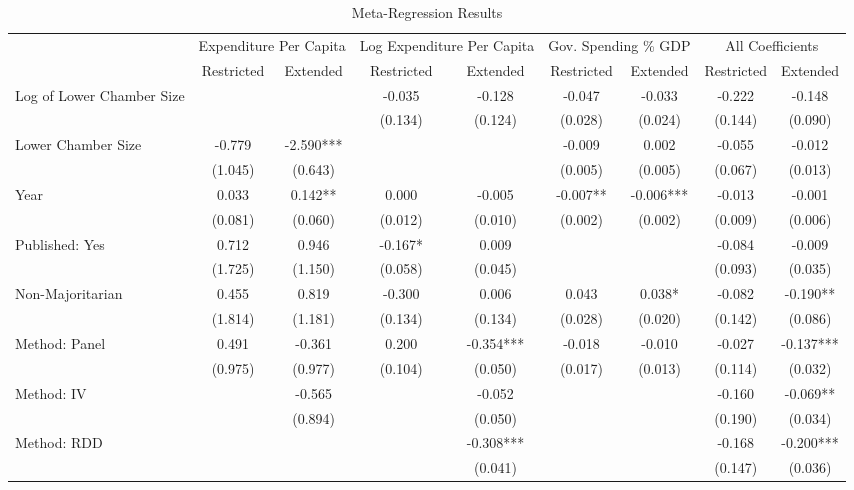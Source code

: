 \documentclass[11pt,a4paper,]{article}
\begin{document}
\begin{table}[htpb]
\caption{Meta-Regression Results\label{tab:regressions}}
\scriptsize
\centering
\begin{tabular}{lcccccccc}
\toprule
\midrule
\multicolumn{1}{c}{ } & \multicolumn{2}{c}{Expenditure Per Capita} & \multicolumn{2}{c}{Log Expenditure Per Capita} & \multicolumn{2}{c}{Gov. Spending \% GDP} & \multicolumn{2}{c}{All Coefficients} \\
\cmidrule(l{3pt}r{3pt}){2-3} \cmidrule(l{3pt}r{3pt}){4-5} \cmidrule(l{3pt}r{3pt}){6-7} \cmidrule(l{3pt}r{3pt}){8-9}
& Restricted & Extended & Restricted & Extended & Restricted & Extended & Restricted & Extended \\
\midrule
Log of Lower Chamber Size & 
 &  & 
-0.035 & -0.128 & 
-0.047 & -0.033 &
-0.222 & -0.148 \\
 &  &  & 
(0.134) & (0.124) & 
(0.028) & (0.024) & 
(0.144) & (0.090) \\
%
Lower Chamber Size &
-0.779 & -2.590*** & 
 &  & 
-0.009 & 0.002 &
-0.055 & -0.012 \\
 & (1.045) & (0.643) & 
 &  & 
(0.005) & (0.005) & 
(0.067) & (0.013) \\
%
Year & 
0.033 & 0.142** & 
0.000 & -0.005 & 
-0.007** & -0.006*** &
-0.013 & -0.001 \\
& (0.081) & (0.060) & 
(0.012) & (0.010) & 
(0.002) & (0.002) & 
(0.009) & (0.006) \\
%
Published: Yes & 
0.712 & 0.946 & 
-0.167* & 0.009 & 
 &  &
-0.084 & -0.009 \\
& (1.725) & (1.150) & 
(0.058) & (0.045) & 
 &  & 
(0.093) & (0.035) \\
%
Non-Majoritarian & 
0.455 & 0.819 & 
-0.300 & 0.006 & 
0.043 & 0.038* &
-0.082 & -0.190** \\
& (1.814) & (1.181) & 
(0.134) & (0.134) & 
(0.028) & (0.020) & 
(0.142) & (0.086) \\
%
Method: Panel & 
0.491 & -0.361 & 
0.200 & -0.354*** & 
-0.018 & -0.010 &
-0.027 & -0.137*** \\
& (0.975) & (0.977) & 
(0.104) & (0.050) & 
(0.017) & (0.013) & 
(0.114) & (0.032) \\
%
Method: IV & 
 & -0.565 & 
 & -0.052 & 
 &  &
-0.160 & -0.069** \\
&  & (0.894) & 
 & (0.050) & 
 &  & 
(0.190) & (0.034) \\
%
Method: RDD &
 &  & 
 & -0.308*** & 
 &  &
-0.168 & -0.200*** \\
&  &  & 
 & (0.041) & 
 &  & 
(0.147) & (0.036) \\

\end{tabular}
\end{table}
\end{document}
